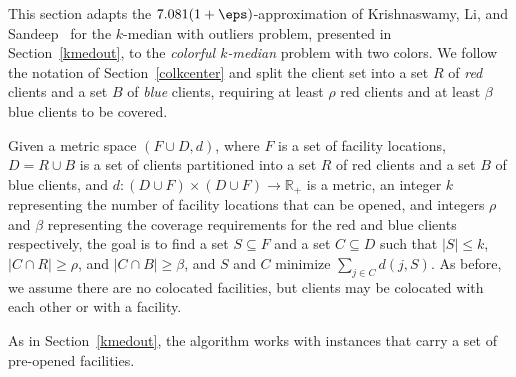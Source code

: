 %

This section adapts the $7.081(1+\eps)$-approximation of Krishnaswamy, Li, and Sandeep~\cite{KLS2018} for the $k$-median with outliers problem, presented in Section~\ref{kmedout}, to the \emph{colorful $k$-median} problem with two colors. We follow the notation of Section~\ref{colkcenter} and split the client set into a set $R$ of \emph{red} clients and a set $B$ of \emph{blue} clients, requiring at least $\rho$ red clients and at least $\beta$ blue clients to be covered.

\begin{problem}
Given a metric space $(F \cup D, d)$, where $F$ is a set of facility locations, $D = R \cup B$ is a set of clients partitioned into a set $R$ of red clients and a set $B$ of blue clients, and $d : (D \cup F) \times (D \cup F) \to \mathbb{R}_+$ is a metric, an integer $k$ representing the number of facility locations that can be opened, and integers $\rho$ and $\beta$ representing the coverage requirements for the red and blue clients respectively, the goal is to find a set $S \subseteq F$ and a set $C \subseteq D$ such that $|S| \le k$, $|C \cap R| \geq \rho$, and $|C \cap B| \geq \beta$, and $S$ and $C$ minimize $\sum_{j \in C} d(j,S)$.
As before, we assume there are no colocated facilities, but clients may be colocated with each other or with a facility.
\end{problem}

As in Section~\ref{kmedout}, the algorithm works with instances that carry a set of pre-opened facilities.

